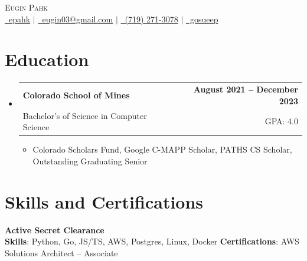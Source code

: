\documentclass[11pt, letterpaper]{article}
\makeatletter
\newcommand{\resumeItem}[1]{
  \item\small{
    {#1 \vspace{-2pt}}
  }
}
\newcommand{\resumeSubheading}[4]{
  \vspace{-2pt}\item
    \begin{tabular*}{1.0\textwidth}[t]{l@{\extracolsep{\fill}}r}
      \textbf{#1} & \textbf{\small #2} \\
      {\small#3} & {\small #4} \\
    \end{tabular*}\vspace{-7pt}
}
\newcommand{\resumeSubHeadingListStart}{\begin{itemize}[leftmargin=0.0in, label={}]}
\newcommand{\resumeSubHeadingListEnd}{\end{itemize}}
\newcommand{\resumeItemListStart}{\begin{itemize}}
\newcommand{\resumeItemListEnd}{\end{itemize}\vspace{-5pt}}
\makeatother
\begin{document}
\begin{center}
    {
    \huge \scshape Eugin Pahk} \\ \vspace{4pt}
    \small
    \href{https://linkedin.com/in/epahk}{\faLinkedin\ epahk}  $|$
    \href{mailto:eugin03@gmail.com}{\faEnvelope\ eugin03@gmail.com} $|$
    \href{tel:7192713078}{\faPhone\ (719) 271-3078} $|$ 
    \href{https://github.com/gosueep}{\faGithub\ gosueep}
    \vspace{-5pt}
\end{center}



\section{Education}   %
  \resumeSubHeadingListStart
    \resumeSubheading
      {Colorado School of Mines}{August 2021 -- December 2023}
      {Bachelor's of Science in Computer Science }{GPA: 4.0}
      \resumeItemListStart
        \resumeItem{Colorado Scholars Fund, Google C-MAPP Scholar, PATHS CS Scholar, Outstanding Graduating Senior}
      \resumeItemListEnd
    \resumeSubHeadingListEnd

\section{Skills and Certifications}   %
 \begin{itemize}[leftmargin=0.1in, label={}]
    \small{\item{
      \textbf{Active Secret Clearance} \\
      \textbf{Skills}{: Python, Go, JS/TS, AWS, Postgres, Linux, Docker} \hspace{4em}
      \textbf{Certifications}{: AWS Solutions Architect -- Associate } \\
    }}
 \end{itemize}
\end{document}
